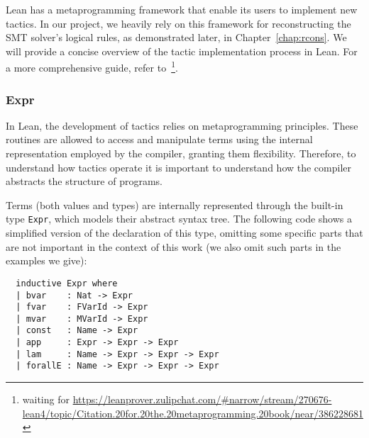Lean has a metaprogramming framework that enable its users to implement new tactics. In our project, we heavily rely on this framework for reconstructing the SMT solver's logical rules, as demonstrated later, in Chapter~\ref{chap:rcons}. We will provide a concise overview of the tactic implementation process in Lean. For a more comprehensive guide, refer to~\cite{metaLean}\footnote{waiting for \url{https://leanprover.zulipchat.com/\#narrow/stream/270676-lean4/topic/Citation.20for.20the.20metaprogramming.20book/near/386228681}}.

\subsubsection{Expr}

In Lean, the development of tactics relies on metaprogramming principles. These routines are allowed to access and manipulate terms using the internal representation employed by the compiler, granting them flexibility. Therefore, to understand how tactics operate it is important to understand how the compiler abstracts the structure of programs.

Terms (both values and types) are internally represented through the built-in type \texttt{Expr}, which models their abstract syntax tree. The following code shows a simplified version of the declaration of this type, omitting some specific parts that are not important in the context of this work (we also omit such parts in the examples we give):

\begin{verbatim}
  inductive Expr where
  | bvar    : Nat -> Expr
  | fvar    : FVarId -> Expr
  | mvar    : MVarId -> Expr
  | const   : Name -> Expr
  | app     : Expr -> Expr -> Expr
  | lam     : Name -> Expr -> Expr -> Expr
  | forallE : Name -> Expr -> Expr -> Expr
\end{verbatim}

